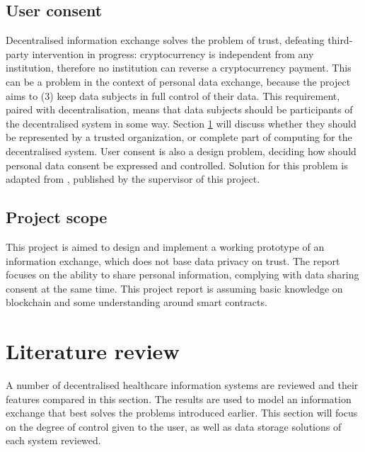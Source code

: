 \documentclass[12pt]{article}
\begin{document}
    \subsection{User consent}
    Decentralised information exchange solves the problem of trust, defeating third-party intervention in progress: cryptocurrency is independent from any institution, therefore no institution can reverse a cryptocurrency payment. This can be a problem in the context of personal data exchange, because the project aims to (3) keep data subjects in full control of their data. This requirement, paired with decentralisation, means that data subjects should be participants of the decentralised system in some way. Section \ref{sec:literature} will discuss whether they should be represented by a trusted organization, or complete part of computing for the decentralised system. User consent is also a design problem, deciding how should personal data consent be expressed and controlled. Solution for this problem is adapted from \cite{konstantinidis}, published by the supervisor of this project.
    
    \subsection*{Project scope}
    This project is aimed to design and implement a working prototype of an information exchange, which does not base data privacy on trust. The report focuses on the ability to share personal information, complying with data sharing consent at the same time. This project report is assuming basic knowledge on blockchain and some understanding around smart contracts.

    
    \section{Literature review}
    \label{sec:literature}
    A number of decentralised healthcare information systems are reviewed and their features compared in this section. The results are used to model an information exchange that best solves the problems introduced earlier. This section will focus on the degree of control given to the user, as well as data storage solutions of each system reviewed.
\end{document}
